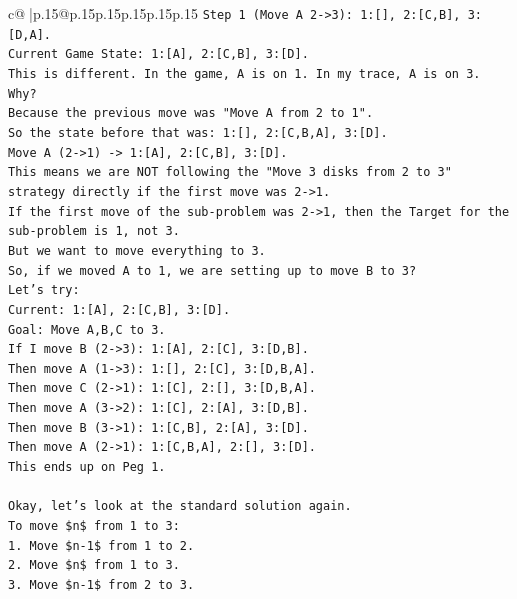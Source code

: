 \documentclass{article}
\begin{document}
{\begin{supertabular}{c@{$\;$}|p{.15\linewidth}@{}p{.15\linewidth}p{.15\linewidth}p{.15\linewidth}p{.15\linewidth}p{.15\linewidth}}
{{{\texttt{Step 1 (Move A 2{-}>3): 1:{[}{]}, 2:{[}C,B{]}, 3:{[}D,A{]}.} \\
\texttt{Current Game State: 1:{[}A{]}, 2:{[}C,B{]}, 3:{[}D{]}.} \\
\texttt{This is different. In the game, A is on 1. In my trace, A is on 3.} \\
\texttt{Why?} \\
\texttt{Because the previous move was "Move A from 2 to 1".} \\
\texttt{So the state before that was: 1:{[}{]}, 2:{[}C,B,A{]}, 3:{[}D{]}.} \\
\texttt{Move A (2{-}>1) {-}> 1:{[}A{]}, 2:{[}C,B{]}, 3:{[}D{]}.} \\
\texttt{This means we are NOT following the "Move 3 disks from 2 to 3" strategy directly if the first move was 2{-}>1.} \\
\texttt{If the first move of the sub{-}problem was 2{-}>1, then the Target for the sub{-}problem is 1, not 3.} \\
\texttt{But we want to move everything to 3.} \\
\texttt{So, if we moved A to 1, we are setting up to move B to 3?} \\
\texttt{Let's try:} \\
\texttt{Current: 1:{[}A{]}, 2:{[}C,B{]}, 3:{[}D{]}.} \\
\texttt{Goal: Move A,B,C to 3.} \\
\texttt{If I move B (2{-}>3): 1:{[}A{]}, 2:{[}C{]}, 3:{[}D,B{]}.} \\
\texttt{Then move A (1{-}>3): 1:{[}{]}, 2:{[}C{]}, 3:{[}D,B,A{]}.} \\
\texttt{Then move C (2{-}>1): 1:{[}C{]}, 2:{[}{]}, 3:{[}D,B,A{]}.} \\
\texttt{Then move A (3{-}>2): 1:{[}C{]}, 2:{[}A{]}, 3:{[}D,B{]}.} \\
\texttt{Then move B (3{-}>1): 1:{[}C,B{]}, 2:{[}A{]}, 3:{[}D{]}.} \\
\texttt{Then move A (2{-}>1): 1:{[}C,B,A{]}, 2:{[}{]}, 3:{[}D{]}.} \\
\texttt{This ends up on Peg 1.} \\
\\ 
\texttt{Okay, let's look at the standard solution again.} \\
\texttt{To move \$n\$ from 1 to 3:} \\
\texttt{1. Move \$n{-}1\$ from 1 to 2.} \\
\texttt{2. Move \$n\$ from 1 to 3.} \\
\texttt{3. Move \$n{-}1\$ from 2 to 3.} \\
}}}
\end{supertabular}}
\end{document}

